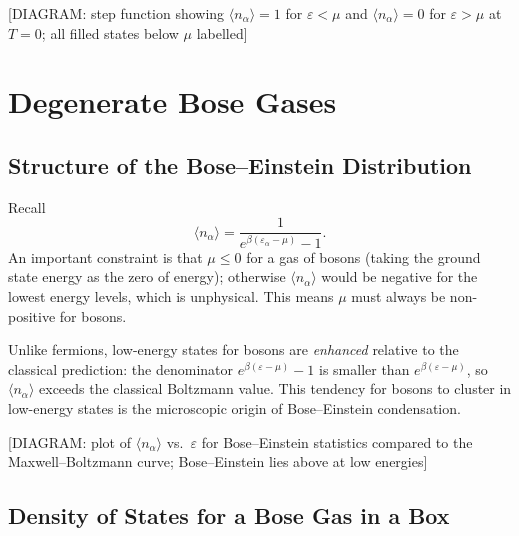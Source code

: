 \begin{center}[DIAGRAM: step function showing $\langle n_\alpha\rangle = 1$ for $\varepsilon < \mu$ and $\langle n_\alpha\rangle = 0$ for $\varepsilon > \mu$ at $T=0$; all filled states below $\mu$ labelled]\end{center}

\section{Degenerate Bose Gases}

\subsection{Structure of the Bose--Einstein Distribution}

Recall
\begin{equation}
    \langle n_\alpha\rangle = \frac{1}{e^{\beta(\varepsilon_\alpha - \mu)} - 1}.
\end{equation}
An important constraint is that $\mu \leq 0$ for a gas of bosons (taking the ground state energy as the zero of energy); otherwise $\langle n_\alpha\rangle$ would be negative for the lowest energy levels, which is unphysical. This means $\mu$ must always be non-positive for bosons.

Unlike fermions, low-energy states for bosons are \emph{enhanced} relative to the classical prediction: the denominator $e^{\beta(\varepsilon-\mu)}-1$ is smaller than $e^{\beta(\varepsilon-\mu)}$, so $\langle n_\alpha\rangle$ exceeds the classical Boltzmann value. This tendency for bosons to cluster in low-energy states is the microscopic origin of Bose--Einstein condensation.

\begin{center}[DIAGRAM: plot of $\langle n_\alpha\rangle$ vs.\ $\varepsilon$ for Bose--Einstein statistics compared to the Maxwell--Boltzmann curve; Bose--Einstein lies above at low energies]\end{center}

\subsection{Density of States for a Bose Gas in a Box}

